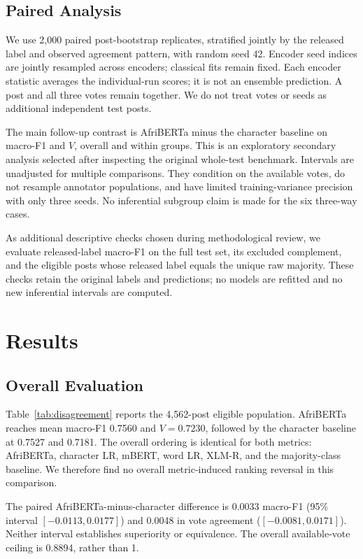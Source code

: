 \documentclass[conference]{IEEEtran}
\begin{document}
\subsection{Paired Analysis}
We use 2,000 paired post-bootstrap replicates, stratified jointly by the
released label and observed agreement pattern, with random seed 42.
Encoder seed indices are jointly resampled across encoders; classical fits
remain fixed. Each encoder statistic averages the individual-run scores;
it is not an ensemble prediction. A post and all three votes remain together.
We do not treat votes or seeds as additional independent test posts.

The main follow-up contrast is AfriBERTa minus the character baseline on
macro-F1 and $V$, overall and within groups. This is an exploratory secondary
analysis selected after inspecting the original whole-test benchmark.
Intervals are unadjusted for multiple comparisons. They condition on the
available votes, do not resample annotator populations, and have limited
training-variance precision with only three seeds. No inferential subgroup
claim is made for the six three-way cases.

As additional descriptive checks chosen during methodological review, we
evaluate released-label macro-F1 on the full test set, its excluded complement,
and the eligible posts whose released label equals the unique raw majority.
These checks retain the original labels and predictions; no models are refitted
and no new inferential intervals are computed.

\section{Results}
\subsection{Overall Evaluation}
Table~\ref{tab:disagreement} reports the 4,562-post eligible population.
AfriBERTa reaches mean macro-F1 0.7560 and $V=0.7230$, followed by the
character baseline at 0.7527 and 0.7181. The overall ordering is identical
for both metrics: AfriBERTa, character LR, mBERT, word LR, XLM-R, and the
majority-class baseline. We therefore find no overall metric-induced
ranking reversal in this comparison.

The paired AfriBERTa-minus-character difference is 0.0033 macro-F1
(95\% interval $[-0.0113,0.0177]$) and 0.0048 in vote agreement
($[-0.0081,0.0171]$). Neither interval establishes superiority or equivalence.
The overall available-vote ceiling is 0.8894, rather than 1.
\end{document}
